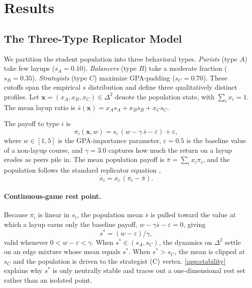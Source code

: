 \documentclass[12pt]{article}
\begin{document}
\section{Results}

\subsection{The Three-Type Replicator Model}

We partition the student population into three behavioral types.
\emph{Purists} (type $A$) take few layups ($s_A = 0.10$).
\emph{Balancers} (type $B$) take a moderate fraction ($s_B = 0.35$).
\emph{Strategists} (type $C$) maximize GPA-padding ($s_C = 0.70$).
These cutoffs span the empirical $s$ distribution and define three
qualitatively distinct profiles. Let
$\bm{x} = (x_A, x_B, x_C) \in \Delta^2$ denote the population state,
with $\sum_i x_i = 1$. The mean layup ratio is
$\bar{s}(\bm{x}) = x_A s_A + x_B s_B + x_C s_C$.

The payoff to type $i$ is
\begin{equation}
  \pi_i(\bm{x}, w) = s_i\,(w - \gamma\,\bar{s} - \varepsilon) + \varepsilon,
  \label{eq:payoff}
\end{equation}
where $w \in [1,5]$ is the GPA-importance parameter, $\varepsilon = 0.5$
is the baseline value of a non-layup course, and $\gamma = 3.0$
captures how much the return on a layup erodes as peers pile in. The
mean population payoff is $\bar{\pi} = \sum_i x_i \pi_i$, and the
population follows the standard replicator equation
\parencite{taylor1978evolutionary},
\begin{equation}
  \dot{x}_i = x_i\,(\pi_i - \bar{\pi}).
  \label{eq:replicator}
\end{equation}

\paragraph{Continuous-game rest point.}
\label{sec:cont-ess}
Because $\pi_i$ is linear in $s_i$, the population mean $\bar s$ is
pulled toward the value at which a layup earns only the baseline payoff,
$w - \gamma \bar s - \varepsilon = 0$, giving
\begin{equation}
  s^\ast = (w - \varepsilon) / \gamma,
  \label{eq:cont_ess}
\end{equation}
valid whenever $0 < w - \varepsilon < \gamma$. When
$s^\ast \in (s_A, s_C)$, the dynamics on $\Delta^2$ settle on an edge
mixture whose mean equals $s^\ast$. When $s^\ast > s_C$, the mean is
clipped at $s_C$ and the population is driven to the strategist
(C) vertex. \ref{app:stability} explains why $s^\ast$ is only
neutrally stable and traces out a one-dimensional rest set rather than
an isolated point.
\end{document}
